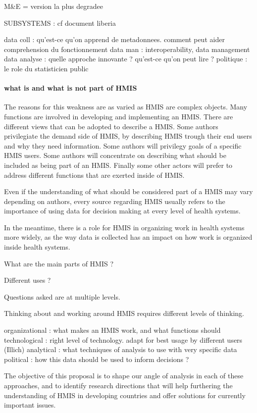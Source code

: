 \documentclass[a4paper,11pt,final,twoside]{article}
\begin{document}
M\&E = version la plus degradee

SUBSYSTEMS : cf document liberia

data coll : qu'est-ce qu'on apprend de metadonnees. comment peut aider comprehension du fonctionnement
data man : interoperability, data management
data analyse : quelle approche innovante ? qu'est-ce qu'on peut lire ?
politique : le role du statisticien public


\paragraph{what is and what is not part of HMIS} The reasons for this weakness are as varied as HMIS are complex objects. Many functions are involved in developing and implementing an HMIS. There are different views that can be adopted to describe a HMIS. Some authors privilegiate the demand side of HMIS, by describing HMIS trough their end users and why they need information. Some authors will privilegy goals of a specific HMIS users. Some authors will concentrate on describing what should be included as being part of an HMIS. Finally some other actors will prefer to address different functions that are exerted inside of HMIS. 

Even if the understanding of what should be considered part of a HMIS may vary depending on authors, every source regarding HMIS usually refers to the importance of using data for decision making at every level of health systems. 

In the meantime, there is a role for HMIS in organizing work in health systems more widely, as the way data is collected has an impact on how work is organized inside health systems. 

What are the main parts of HMIS ?

Different uses ?

Questions asked are at multiple levels.

Thinking about and working around HMIS requires different levels of thinking. 

organizational : what makes an HMIS work, and what functions should 
technological : right level of technology. adapt for best usage by different users (Illich)
analytical : what techniques of analysis to use with very specific data 
political : how this data should be used to inform decisions ?

The objective of this proposal is to shape our angle of analysis in each of these approaches, and to identify research directions that will help furthering the understanding of HMIS in developing countries and offer solutions for currently important issues.
\end{document}
